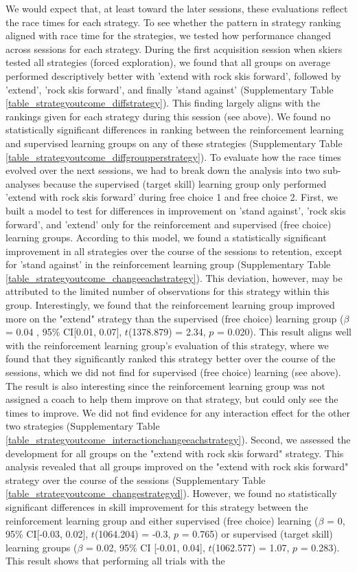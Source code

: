 \documentclass[pdflatex,sn-nature]{sn-jnl}%
\theoremstyle{thmstyleone}%
\theoremstyle{thmstyletwo}%
\theoremstyle{thmstylethree}%
\begin{document}
We would expect that, at least toward the later sessions, these evaluations reflect the race times for each strategy. To see whether the pattern in strategy ranking aligned with race time for the strategies, we tested how performance changed across sessions for each strategy. During the first acquisition session when skiers tested all strategies (forced exploration), we found that all groups on average performed descriptively better with 'extend with rock skis forward', followed by 'extend', 'rock skis forward', and finally 'stand against' (Supplementary Table \ref{table_strategyoutcome_diffstrategy}). This finding largely aligns with the rankings given for each strategy during this session (see above). We found no statistically significant differences in ranking between the reinforcement learning and supervised learning groups on any of these strategies (Supplementary Table \ref{table_strategyoutcome_diffgroupperstrategy}). To evaluate how the race times evolved over the next sessions, we had to break down the analysis into two sub-analyses because the supervised (target skill) learning group only performed 'extend with rock skis forward' during free choice 1 and free choice 2. First, we built a model to test for differences in improvement on 'stand against', 'rock skis forward', and 'extend' only for the reinforcement  and supervised (free choice) learning groups. According to this model, we found a statistically significant improvement in all strategies over the course of the sessions to retention, except for 'stand against' in the reinforcement learning group (Supplementary Table \ref{table_strategyoutcome_changeeachstrategy}). This deviation, however, may be attributed to the limited number of observations for this strategy within this group. Interestingly, we found that the reinforcement learning group improved more on the "extend" strategy than the supervised (free choice) learning group ($\beta$ = 0.04 , 95\% CI[0.01, 0.07], $t$(1378.879) = 2.34, $p$ = 0.020). This result aligns well with the reinforcement learning group's evaluation of this strategy, where we found that they significantly ranked this strategy better over the course of the sessions, which we did not find for supervised (free choice) learning (see above). The result is also interesting since the reinforcement learning group was not assigned a coach to help them improve on that strategy, but could only see the times to improve. We did not find evidence for any interaction effect for the other two strategies (Supplementary Table \ref{table_strategyoutcome_interactionchangeeachstrategy}). Second, we assessed the development for all groups on the "extend with rock skis forward" strategy. This analysis revealed that all groups improved on the "extend with rock skis forward" strategy  over the course of the sessions (Supplementary Table \ref{table_strategyoutcome_changestrategyd}). However, we found no statistically significant differences in skill improvement for this strategy between the reinforcement learning group and either supervised (free choice) learning ($\beta$ = 0, 95\% CI[-0.03, 0.02], $t$(1064.204) = -0.3, $p$ = 0.765) or supervised (target skill) learning groups ($\beta$ = 0.02, 95\% CI [-0.01, 0.04], $t$(1062.577) = 1.07, $p$ = 0.283). This result shows that performing all trials with the 
\end{document}
